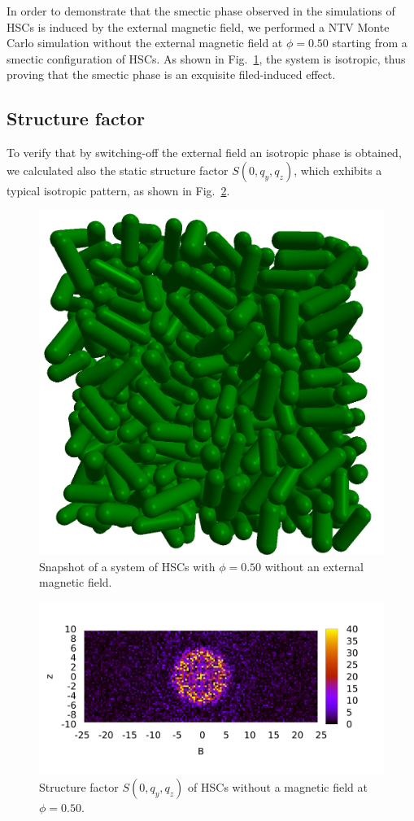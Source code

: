\documentclass[aip,graphicx]{revtex4-1} %
\begin{document}
In order to demonstrate that the smectic phase observed in the simulations of HSCs is induced by the external magnetic field, 
we performed a NTV Monte Carlo simulation without the external magnetic field at $\phi=0.50$ starting from a smectic configuration  
of HSCs.  As shown in Fig.~\ref{fig:noB_snapshot}, the system is isotropic, 
thus proving that the smectic phase is an exquisite filed-induced effect.

\subsection{Structure factor}
To verify that by switching-off the external field an isotropic phase is obtained, 
we calculated also the static structure factor $S(0, q_y, q_z)$, which exhibits a typical isotropic pattern, 
as shown in Fig.~\ref{fig:Syz_noB}.


\begin{figure}
    \centering
    \includegraphics[width=0.4\columnwidth]{Isotropic_phase_snap.png}
    \caption{Snapshot of a system of HSCs with $\phi = 0.50$ without an external magnetic field.}\label{fig:noB_snapshot}
\end{figure}

\begin{figure}
    \centering
    \includegraphics[width=0.7\columnwidth]{Syz_noB.png}
    \caption{Structure factor $S(0, q_y, q_z)$ of HSCs without a magnetic field at $\phi=0.50$.}\label{fig:Syz_noB}
\end{figure}
\end{document}
